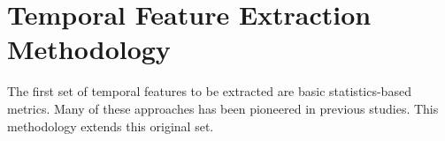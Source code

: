 \section{Temporal Feature Extraction Methodology}
\label{sec:featureextraction}

The first set of temporal features to be extracted are basic statistics-based metrics. Many of these approaches has been pioneered in previous studies. This methodology extends this original set.

